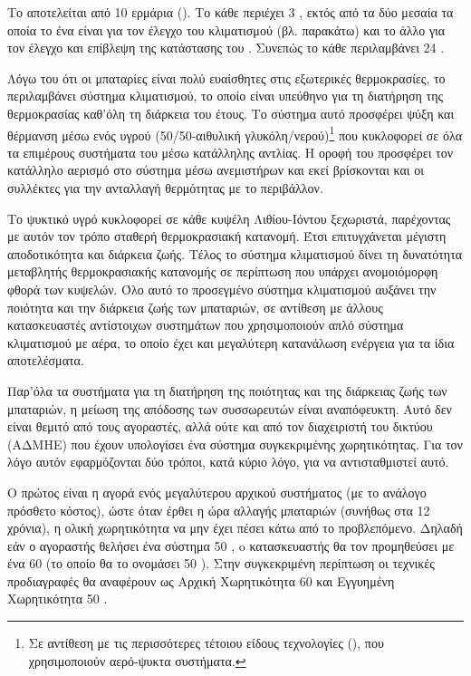 \documentclass[12pt]{report}
\begin{document}
Το {} αποτελείται από 10 ερμάρια ({}). Το κάθε {} περιέχει 3 {}, εκτός από τα δύο μεσαία τα οποία το ένα είναι για τον έλεγχο του κλιματισμού 
(βλ. παρακάτω) και το άλλο για τον έλεγχο και επίβλεψη της κατάστασης του {}. Συνεπώς το κάθε {} περιλαμβάνει 24 {}.

Λόγω του ότι οι μπαταρίες είναι πολύ ευαίσθητες στις εξωτερικές θερμοκρασίες, το {} περιλαμβάνει σύστημα κλιματισμού, το οποίο είναι υπεύθηνο για τη διατήρηση της θερμοκρασίας καθ'όλη τη διάρκεια του έτους. 
Το σύστημα αυτό προσφέρει ψύξη και θέρμανση μέσω ενός υγρού (50/50-αιθυλική γλυκόλη/νερού)\footnote{Σε αντίθεση με τις περισσότερες τέτοιου είδους τεχνολογίες ({}), που χρησιμοποιούν 
αερό-ψυκτα συστήματα.} που κυκλοφορεί σε όλα τα επιμέρους συστήματα του {} μέσω κατάλληλης αντλίας. Η οροφή του {} προσφέρει τον κατάλληλο αερισμό στο σύστημα μέσω ανεμιστήρων και εκεί 
βρίσκονται και οι συλλέκτες για την ανταλλαγή θερμότητας με το περιβάλλον.

Το ψυκτικό υγρό κυκλοφορεί σε κάθε κυψέλη Λιθίου-Ιόντου ξεχωριστά, παρέχοντας με αυτόν τον τρόπο σταθερή θερμοκρασιακή κατανομή. Έτσι επιτυγχάνεται μέγιστη αποδοτικότητα και διάρκεια ζωής. Τέλος το σύστημα κλιματισμού 
δίνει τη δυνατότητα μεταβλητής θερμοκρασιακής κατανομής σε περίπτωση που υπάρχει ανομοιόμορφη φθορά των κυψελών. Όλο αυτό το προσεγμένο σύστημα κλιματισμού αυξάνει την ποιότητα και την
διάρκεια ζωής των μπαταριών, σε αντίθεση με άλλους κατασκευαστές αντίστοιχων συστημάτων που χρησιμοποιούν απλό σύστημα κλιματισμού με αέρα, το οποίο έχει και μεγαλύτερη κατανάλωση ενέργεια για τα ίδια αποτελέσματα.

Παρ'όλα τα συστήματα για τη διατήρηση της ποιότητας και της διάρκειας ζωής των μπαταριών, η μείωση της απόδοσης των συσσωρευτών είναι αναπόφευκτη. Αυτό δεν είναι θεμιτό από τους αγοραστές, αλλά ούτε και από τον διαχειριστή του 
δικτύου (ΑΔΜΗΕ) που έχουν υπολογίσει ένα σύστημα συγκεκριμένης χωρητικότητας. Για τον λόγο αυτόν εφαρμόζονται δύο τρόποι, κατά κύριο λόγο, για να αντισταθμιστεί αυτό. 

Ο πρώτος είναι η αγορά ενός μεγαλύτερου αρχικού συστήματος (με το ανάλογο πρόσθετο κόστος), ώστε όταν έρθει η ώρα αλλαγής μπαταριών (συνήθως στα 12 χρόνια), η ολική χωρητικότητα να μην έχει πέσει κάτω από το προβλεπόμενο. 
Δηλαδή εάν ο αγοραστής θελήσει ένα σύστημα 50 {}, o κατασκευαστής θα τον προμηθεύσει με ένα 60 {} (το οποίο θα το ονομάσει 50 {}). Στην συγκεκριμένη περίπτωση οι τεχνικές προδιαγραφές 
θα αναφέρουν ως Αρχική Χωρητικότητα 60 {} και Εγγυημένη Χωρητικότητα 50 {}.
\end{document}
